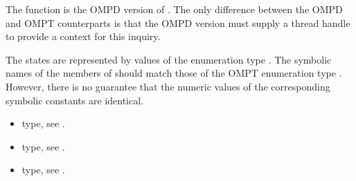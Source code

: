 \descr
The function  is the  OMPD version of
. 
The only difference between the OMPD and OMPT counterparts
is that the OMPD version must supply a thread handle to provide
a context for this inquiry.

\argdesc
The states are represented by values of the enumeration type
.
The symbolic names of the members of  should
match those of the OMPT enumeration type .
However, there is no guarantee that the numeric values of the corresponding
symbolic constants are identical.

\crossreferences
\begin{itemize}
	\item {} type, see .
	\item {} type, see .
	\item {} type, see .
\end{itemize}
